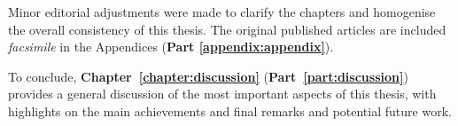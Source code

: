 Minor editorial adjustments were made to clarify the chapters and homogenise the overall consistency of this thesis.
The original published articles are included \textit{facsimile} in the Appendices (\textbf{Part \ref{appendix:appendix}}).

To conclude, \textbf{Chapter~\ref{chapter:discussion}} (\textbf{Part~\ref{part:discussion}}) provides a general discussion of the most important aspects of this thesis, with highlights on the main achievements and final remarks and potential future work. 




